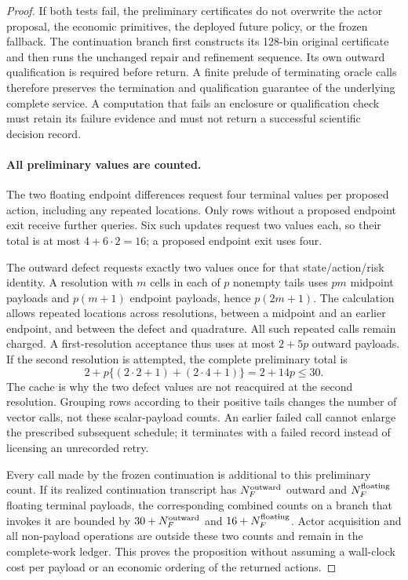 \begin{proof}
If both tests fail, the preliminary certificates do not overwrite
the actor proposal, the economic primitives, the deployed future
policy, or the frozen fallback.  The continuation branch first
constructs its 128-bin original certificate and then runs the
unchanged repair and refinement sequence.  Its own outward
qualification is required before return.  A finite prelude of
terminating oracle calls therefore preserves the termination and
qualification guarantee of the underlying complete service.  A
computation that fails an enclosure or qualification check must
retain its failure evidence and must not return a successful
scientific decision record.

\paragraph{All preliminary values are counted.}
The two floating endpoint differences request four terminal values
per proposed action, including any repeated locations.  Only rows
without a proposed endpoint exit receive further queries.  Six
such updates request two values each, so their total is at most
$4+6\cdot2=16$; a proposed endpoint exit uses four.

The outward defect requests exactly two values once for that
state/action/risk identity.  A resolution with $m$ cells in each
of $p$ nonempty tails uses $pm$ midpoint payloads and $p(m+1)$
endpoint payloads, hence $p(2m+1)$.  The calculation allows repeated
locations across resolutions, between a midpoint and an earlier
endpoint, and between the defect and quadrature.  All such repeated
calls remain charged.  A first-resolution acceptance thus uses at
most $2+5p$ outward payloads.  If the second resolution is attempted,
the complete preliminary total is
\[
 2+p\{(2\cdot2+1)+(2\cdot4+1)\}
      =2+14p\le30.
\]
The cache is why the two defect values are not reacquired at the
second resolution.  Grouping rows according to their positive tails
changes the number of vector calls, not these scalar-payload counts.
An earlier failed call cannot enlarge the prescribed subsequent
schedule; it terminates with a failed record instead of licensing
an unrecorded retry.

Every call made by the frozen continuation is additional to this
preliminary count.  If its realized continuation transcript has
$N_F^{\rm outward}$ outward and $N_F^{\rm floating}$ floating
terminal payloads, the corresponding combined counts on a branch
that invokes it are bounded by
$30+N_F^{\rm outward}$ and $16+N_F^{\rm floating}$.
Actor acquisition and all non-payload operations are outside these
two counts and remain in the complete-work ledger.  This proves
the proposition without assuming a wall-clock cost per payload or
an economic ordering of the returned actions.
\end{proof}

